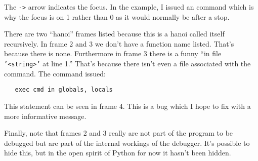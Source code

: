 The {\tt->} arrow indicates the focus. In the example, I issued an
 command which is why the focus is on 1 rather than 0 as it
would normally be after a stop.

There are two ``hanoi'' frames listed because this is a hanoi called
itself recursively. In frame 2 and 3 we don't have a function name
listed. That's because there is none. Furthermore in frame 3 there is
a funny ``in file {\tt '<string>'} at line 1.'' That's because there
isn't even a file associated with the command. The command issued:

\begin{verbatim}
   exec cmd in globals, locals
\end{verbatim}

This statement can be seen in frame 4. This is a bug which I hope to
fix with a more informative message.

Finally, note that frames 2 and 3 really are not part of the
program to be debugged but are part of the internal workings of the
debugger. It's possible to hide this, but in the open spirit of Python
for now it hasn't been hidden.

